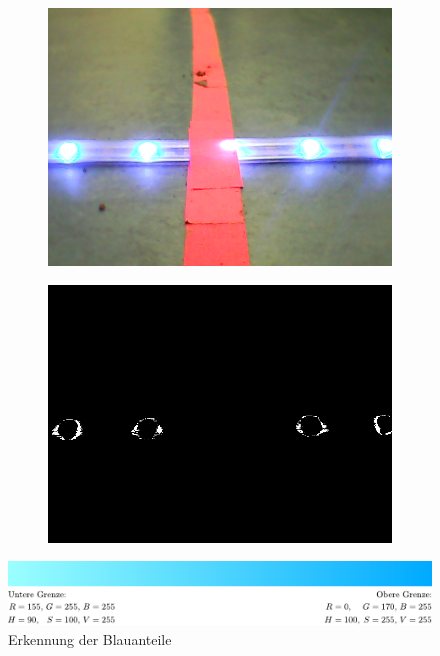 \documentclass[a4paper, 12pt]{scrartcl}
\begin{document}
\begin{figure}[H]
	\centering
	\begin{subfigure}{.5\textwidth}
		\centering
		\includegraphics[width=\textwidth]{../testbilder/blau.png}
	\end{subfigure}%
	\begin{subfigure}{.5\textwidth}
		\centering
		\includegraphics[width=\textwidth]{../testbilder/blau2.png}
	\end{subfigure}
	\vspace{1ex}

	\includegraphics[width=1\textwidth]{../testbilder/Blau_Bereich.pdf}
	\caption{Erkennung der Blauanteile}
\end{figure}
\end{document}
